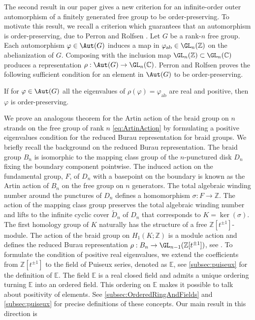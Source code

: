 \documentclass{amsart}
\begin{document}
The second result in our paper gives a new criterion for an infinite-order outer automorphism of a finitely generated free group to be order-preserving. To motivate this result, we recall a criterion which guarantees that an automorphism is order-preserving, due to Perron and Rolfsen \cite[Theorem 2.6]{PerronRolfsen03}. Let $G$ be a rank-$n$ free group. Each automorphism $\varphi\in\Aut(G)$ induces a map in $\varphi_{\mathrm{ab}}\in\GL_{n}(\mathbb{Z})$ on the abelianization of $G$.
Composing with the inclusion map $\GL_{n}(\mathbb{Z})\subset\GL_{n}(\mathbb{C})$ produces a representation $\rho:\Aut(G)\to \GL_{n}(\mathbb{C})$.
Perron and Rolfsen proves the following sufficient condition for an element in $\Aut(G)$ to be order-preserving.

\begin{thm}
If for $\varphi\in\Aut(G)$ all the eigenvalues of $\rho(\varphi) = \varphi_{\mathrm{ab}}$ are real and positive, then $\varphi$ is order-preserving.
\end{thm}

We prove an analogous theorem for the Artin action of the braid group on $n$ strands on the free group of rank $n$ \cref{eq:ArtinAction} by formulating a positive eigenvalues condition for the reduced Burau representation for braid groups. We briefly recall the background on the reduced Burau representation. The braid group $B_n$ is isomorphic to the mapping class group of the $n$-punctured disk $D_n$ fixing the boundary component pointwise. The induced action on the fundamental group, $F$, of $D_n$ with a basepoint on the boundary is known as the Artin action of $B_n$ on the free group on $n$ generators. The total algebraic winding number around the punctures of $D_n$ defines a homomorphism $\sigma: F \to \mathbb{Z}$. The action of the mapping class group preserves the total algebraic winding number and lifts to the infinite cyclic cover $\widetilde{D}_n$ of $D_n$ that corresponds to $K = \ker(\sigma)$. The first homology group of $K$ naturally has the structure of a free $\mathbb{Z}[t^{\pm 1}]$-module. The action of the braid group on $H_1(K;\mathbb{Z})$ is a module action and defines the reduced Burau representation $\rho:B_n \to \GL_{n-1}(\mathbb{Z}[t^{\pm 1}])$, see \cite[Section 3.2.1, 3.3 and Remark 3.11]{kasselturaev08braid}. To formulate the condition of positive real eigenvalues, we extend the coefficients from $\mathbb{Z}[t^{\pm 1}]$ to the field of Puiseux series, denoted as $\mathbb{E}$, see \cref{subsec:puiseux} for the definition of $\mathbb{E}$. The field $\mathbb{E}$ is a real closed field and admits a unique ordering turning $\mathbb{E}$ into an ordered field. This ordering on $\mathbb{E}$ makes it possible to talk about positivity of elements. See \cref{subsec:OrderedRingAndFields} and \cref{subsec:puiseux} for precise definitions of these concepts. Our main result in this direction is 
\end{document}
